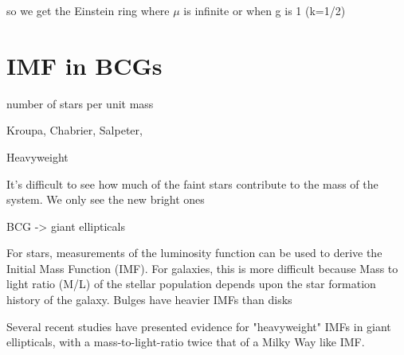 so we get the Einstein ring where $\mu$ is infinite or when g is 1 (k=1/2)

\section{IMF in BCGs}

number of stars per unit mass

Kroupa, Chabrier, Salpeter, 

Heavyweight

It's difficult to see how much of the faint stars contribute to the mass of the system. We only see the new bright ones

BCG -> giant ellipticals

For stars, measurements of the luminosity function can be used to derive the Initial Mass Function (IMF). For galaxies, this is more difficult because Mass to light ratio (M/L) of the stellar population depends upon the star formation history of
the galaxy. Bulges have heavier IMFs than disks

Several recent studies have presented evidence for "heavyweight" IMFs in giant ellipticals, with a mass-to-light-ratio twice that of a Milky Way like IMF.



 
 